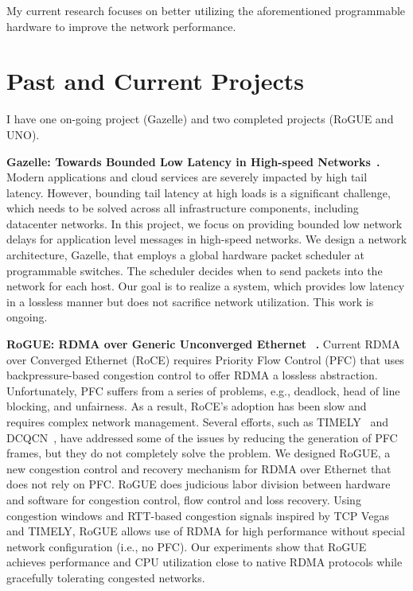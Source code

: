 \documentclass[10pt]{article}
\begin{document}
My current research focuses on better utilizing the aforementioned programmable hardware to improve the network performance. 
\section*{Past and Current Projects}
I have one on-going project (Gazelle) and two completed projects (RoGUE and UNO).

\textbf{Gazelle: Towards Bounded Low Latency in High-speed Networks}~\cite{Gazelle}\textbf{.}
Modern applications and cloud services are severely impacted by high tail
latency.  However, bounding tail latency at high loads is a
significant challenge, which needs to be solved across all infrastructure
components, including datacenter networks.  In this project, we focus on
providing bounded low network delays for application level
messages in high-speed networks. 
We design a network architecture, Gazelle, that employs
a global hardware packet scheduler at programmable switches.
The scheduler decides when to send packets into the network for each host. 
Our goal is to realize a system, which provides low latency in a lossless manner
but does not sacrifice network utilization. 
This work is ongoing.

\textbf{RoGUE: RDMA over Generic Unconverged Ethernet}~
\cite{Le:2018:rogue}\textbf{.} Current RDMA over Converged Ethernet (RoCE) requires Priority Flow
Control (PFC) that uses backpressure-based congestion
control to offer RDMA a lossless abstraction. Unfortunately,
PFC suffers from a series of problems, e.g., deadlock, head of line blocking, and unfairness. 
As a result,
RoCE’s adoption has been slow and requires complex
network management. Several efforts, such as TIMELY~\cite{Mittal:2015:TRC}
and DCQCN~\cite{Zhu:2015:CCL}, have addressed some of the issues by reducing
the generation of PFC frames, but they do not completely
solve the problem.
We designed RoGUE, a new congestion control and
recovery mechanism for RDMA over Ethernet that does
not rely on PFC. RoGUE does judicious labor division 
between hardware and software for congestion control, flow control and loss recovery.  
Using congestion windows and RTT-based
congestion signals inspired by TCP Vegas and
TIMELY, RoGUE allows use of RDMA for high performance
without special network configuration (i.e., no PFC).
Our experiments show that RoGUE achieves
performance and CPU utilization close to native RDMA
protocols while gracefully tolerating congested networks.
\end{document}
